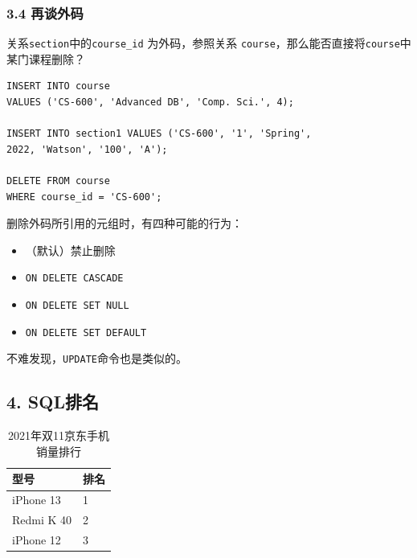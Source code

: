 \documentclass[aspectratio=169, 14pt]{beamer}
\begin{document}
\begin{frame}[fragile]
	\frametitle{3.4 再谈外码}
	关系\texttt{section}中的\texttt{course\_id} 为外码，参照关系 \texttt{course}，那么能否直接将\texttt{course}中某门课程删除？

	\begin{verbatim}
INSERT INTO course
VALUES ('CS-600', 'Advanced DB', 'Comp. Sci.', 4);

INSERT INTO section1 VALUES ('CS-600', '1', 'Spring', 
2022, 'Watson', '100', 'A');

DELETE FROM course
WHERE course_id = 'CS-600';
\end{verbatim}

\end{frame}

\begin{frame}
	删除外码所引用的元组时，有四种可能的行为：
	\begin{itemize}
		\item（默认）禁止删除
		\item \texttt{ON DELETE CASCADE}
		\item \texttt{ON DELETE SET NULL}
		\item \texttt{ON DELETE SET DEFAULT}
	\end{itemize}

	不难发现，\texttt{UPDATE}命令也是类似的。

\end{frame}

\begin{frame}
	\section{\textcolor{darkmidnightblue}{4. SQL排名}}

	\begin{table}
		\caption*{2021年双11京东手机销量排行}
		\begin{tabular}{ll}
			\toprule
			型号         & 排名 \\
			\midrule
			iPhone 13  & 1  \\
			Redmi K 40 & 2  \\
			iPhone 12  & 3  \\
			\bottomrule
		\end{tabular}
	\end{table}
\end{frame}
\end{document}

